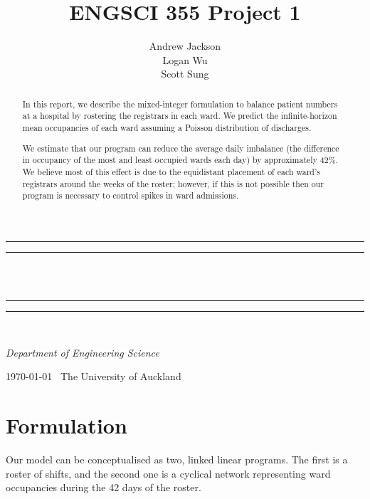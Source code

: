 \documentclass[a4paper]{article}
\title{ENGSCI 355 Project 1}
\author{Andrew Jackson\\Logan Wu\\Scott Sung}
\newlength{\drop}
\begin{document}
\begin{titlepage}
    \textheight
    \centering
    \vspace*{\baselineskip}
    \rule{\textwidth}{1.6pt}\vspace*{-\baselineskip}\vspace*{2pt}
    \rule{\textwidth}{0.4pt}\\[\baselineskip]
    {\LARGE \@title}\\[0.2\baselineskip]
    \rule{\textwidth}{0.4pt}\vspace*{-\baselineskip}\vspace{3.2pt}
    \rule{\textwidth}{1.6pt}\\[\baselineskip]
    \vspace*{2\baselineskip}
    {\Large \textsc{\@author}\par}
    {\itshape Department of Engineering Science\par}
    \vspace*{2\baselineskip}
    {\scshape \today} \        {\large The University of Auckland}\par
    \vspace{\fill}
    \begin{abstract}
    In this report, we describe the mixed-integer formulation to balance patient numbers at a hospital by rostering the registrars in each ward. We predict the infinite-horizon mean occupancies of each ward assuming a Poisson distribution of discharges.
    
We estimate that our program can reduce the average daily imbalance (the difference in occupancy of the most and least occupied wards each day) by approximately 42\%. We believe most of this effect is due to the equidistant placement of each ward's registrars around the weeks of the roster; however, if this is not possible then our program is necessary to control spikes in ward admissions.
    \end{abstract}
    \vspace{\fill}
\end{titlepage}
\makeatother
\pagestyle{fancy}

\section{Formulation}

Our model can be conceptualised as two, linked linear programs. The first is a roster of shifts, and the second one is a cyclical network representing ward occupancies during the 42 days of the roster.
\end{document}
